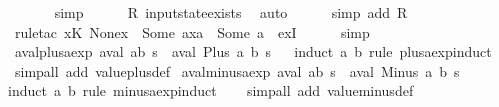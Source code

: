 \begin{isabellebody}
\ \ \ \ \ \isamarkupfalse%
\ simp\isanewline
\ \ \ \ \isamarkupfalse%
\ R\ input{}state{\isacharunderscore}exists\ \isamarkupfalse%
\ auto{\isacharbrackleft}{}{\isacharbrackright}\isanewline
\ \ \ \ \isamarkupfalse%
\ {\isacharparenleft}simp\ add{\isacharcolon}\ R{\isacharparenright}\isanewline
\ \ \ \ \isamarkupfalse%
\ {\isacharparenleft}rule{\isacharunderscore}tac\ x{\isacharequal}{\isachardoublequoteopen}{\isacharparenleft}K{\isachardollar}\ None{\isacharparenright}{\isacharparenleft}x{}\ {\isachardollar}{\isacharcolon}{\isacharequal}\ Some\ a{\isacharparenright}{\isacharparenleft}x{}a\ {\isachardollar}{\isacharcolon}{\isacharequal}\ Some\ a{\isacharprime}{\isacharparenright}{\isachardoublequoteclose}\ \ exI{\isacharparenright}\isanewline
\ \ \ \ \isamarkupfalse%
\ simp\isanewline
{}\isamarkupfalse%
%
\endisatagproof
{\isafoldproof}%
%
\isadelimproof
\isanewline
%
\endisadelimproof
\isanewline
{}\isamarkupfalse%
\ aval{\isacharunderscore}plus{\isacharunderscore}aexp{\isacharcolon}\ {\isachardoublequoteopen}aval\ {\isacharparenleft}a{\isacharplus}b{\isacharparenright}\ s\ {\isacharequal}\ aval\ {\isacharparenleft}Plus\ a\ b{\isacharparenright}\ s{\isachardoublequoteclose}\isanewline
%
\isadelimproof
\ \ %
\endisadelimproof
%
\isatagproof
{}\isamarkupfalse%
{\isacharparenleft}induct\ a\ b\ rule{\isacharcolon}\ plus{\isacharunderscore}aexp{\isachardot}induct{\isacharparenright}\isanewline
\ \ \isamarkupfalse%
\ {\isacharparenleft}simp{\isacharunderscore}all\ add{\isacharcolon}\ value{\isacharunderscore}plus{\isacharunderscore}def{\isacharparenright}%
\endisatagproof
{\isafoldproof}%
%
\isadelimproof
\isanewline
%
\endisadelimproof
\isanewline
{}\isamarkupfalse%
\ aval{\isacharunderscore}minus{\isacharunderscore}aexp{\isacharcolon}\ {\isachardoublequoteopen}aval\ {\isacharparenleft}a{\isacharminus}b{\isacharparenright}\ s\ {\isacharequal}\ aval\ {\isacharparenleft}Minus\ a\ b{\isacharparenright}\ s{\isachardoublequoteclose}\isanewline
%
\isadelimproof
\ \ %
\endisadelimproof
%
\isatagproof
{}\isamarkupfalse%
{\isacharparenleft}induct\ a\ b\ rule{\isacharcolon}\ minus{\isacharunderscore}aexp{\isachardot}induct{\isacharparenright}\isanewline
\ \ \isamarkupfalse%
\ {\isacharparenleft}simp{\isacharunderscore}all\ add{\isacharcolon}\ value{\isacharunderscore}minus{\isacharunderscore}def{\isacharparenright}%

\end{isabellebody}
